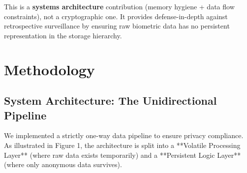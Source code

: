 \documentclass[conference]{IEEEtran}
\begin{document}
This is a \textbf{systems architecture} contribution (memory hygiene + data flow constraints), not a cryptographic one. It provides defense-in-depth against retrospective surveillance by ensuring raw biometric data has no persistent representation in the storage hierarchy.

\section{Methodology}

\subsection{System Architecture: The Unidirectional Pipeline}
We implemented a strictly one-way data pipeline to ensure privacy compliance. As illustrated in Figure 1, the architecture is split into a **Volatile Processing Layer** (where raw data exists temporarily) and a **Persistent Logic Layer** (where only anonymous data survives).
\end{document}
